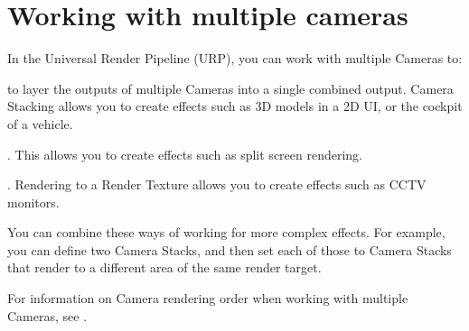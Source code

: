 \chapter{Working with multiple cameras}
\hypertarget{md__hey_tea_9_2_library_2_package_cache_2com_8unity_8render-pipelines_8universal_0d14_80_88_2_dobd686be85ad15bc1573ea5fb6838b8d4}{}\label{md__hey_tea_9_2_library_2_package_cache_2com_8unity_8render-pipelines_8universal_0d14_80_88_2_dobd686be85ad15bc1573ea5fb6838b8d4}
\label{md__hey_tea_9_2_library_2_package_cache_2com_8unity_8render-pipelines_8universal_0d14_80_88_2_dobd686be85ad15bc1573ea5fb6838b8d4_autotoc_md2098}%
%
 In the Universal Render Pipeline (URP), you can work with multiple Cameras to\+:


\begin{DoxyItemize}
\item {} to layer the outputs of multiple Cameras into a single combined output. Camera Stacking allows you to create effects such as 3D models in a 2D UI, or the cockpit of a vehicle.
\item {}. This allows you to create effects such as split screen rendering.
\item {}. Rendering to a Render Texture allows you to create effects such as CCTV monitors.
\end{DoxyItemize}



You can combine these ways of working for more complex effects. For example, you can define two Camera Stacks, and then set each of those to Camera Stacks that render to a different area of the same render target.

For information on Camera rendering order when working with multiple Cameras, see . 